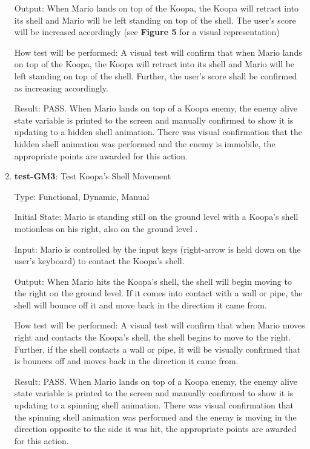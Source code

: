 \documentclass[12pt, titlepage]{article}
\begin{document}
\begin{enumerate}
Output: When Mario lands on top of the Koopa, the Koopa will retract into its shell and Mario will be left standing on top of the shell. The user's score will be increased accordingly (see \textbf{Figure 5} for a visual representation)
					
How test will be performed: A visual test will confirm that when Mario lands on top of the Koopa, the Koopa will retract into its shell and Mario will be left standing on top of the shell. Further, the user's score shall be confirmed as increasing accordingly.

Result: PASS. When Mario lands on top of a Koopa enemy, the enemy alive state variable is printed to the screen and manually confirmed to show it is updating to a hidden shell animation. There was visual confirmation that the hidden shell animation was performed and the enemy is immobile, the appropriate points are awarded for this action.

\item{\textbf{test-GM3}: Test Koopa's Shell Movement\\}

Type: Functional, Dynamic, Manual
					
Initial State: Mario is standing still on the ground level with a Koopa's shell motionless on his right, also on the ground level .
					
Input: Mario is controlled by the input keys (right-arrow is held down on the user's keyboard) to contact the Koopa's shell.
					
Output: When Mario hits the Koopa's shell, the shell will begin moving to the right on the ground level. If it comes into contact with a wall or pipe, the shell will bounce off it and move back in the direction it came from.
					
How test will be performed: A visual test will confirm that when Mario moves right and contacts the Koopa's shell, the shell begins to move to the right. Further, if the shell contacts a wall or pipe, it will be visually confirmed that is bounces off and moves back in the direction it came from.

Result: PASS. When Mario lands on top of a Koopa enemy, the enemy alive state variable is printed to the screen and manually confirmed to show it is updating to a spinning shell animation. There was visual confirmation that the spinning shell animation was performed and the enemy is moving in the direction opposite to the side it was hit, the appropriate points are awarded for this action.


\end{enumerate}
\end{document}
